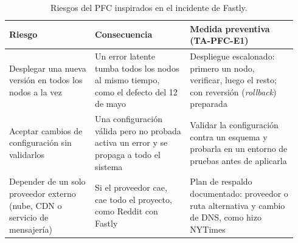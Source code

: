 \begin{table}[h]
\centering
\small
\begin{tabular}{@{}>{\raggedright\arraybackslash}p{0.28\linewidth}>{\raggedright\arraybackslash}p{0.31\linewidth}>{\raggedright\arraybackslash}p{0.35\linewidth}@{}}
\toprule
\textbf{Riesgo} & \textbf{Consecuencia} & \textbf{Medida preventiva (TA-PFC-E1)} \\
\midrule
Desplegar una nueva versión en todos los nodos a la vez &
Un error latente tumba todos los nodos al mismo tiempo, como el defecto del 12 de mayo &
Despliegue escalonado: primero un nodo, verificar, luego el resto; con reversión (\textit{rollback}) preparada \\

Aceptar cambios de configuración sin validarlos &
Una configuración válida pero no probada activa un error y se propaga a todo el sistema &
Validar la configuración contra un esquema y probarla en un entorno de pruebas antes de aplicarla \\

Depender de un solo proveedor externo (nube, CDN o servicio de mensajería) &
Si el proveedor cae, cae todo el proyecto, como Reddit con Fastly &
Plan de respaldo documentado: proveedor o ruta alternativa y cambio de DNS, como hizo NYTimes \\
\bottomrule
\end{tabular}
\caption{Riesgos del PFC inspirados en el incidente de Fastly.}
\end{table}
